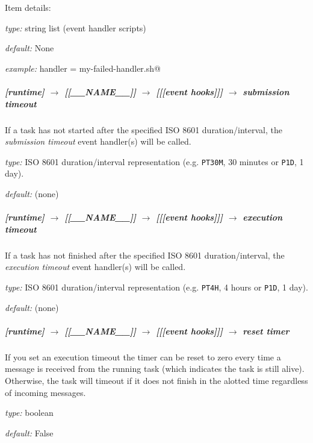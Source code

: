 Item details:
\begin{myitemize}
    \item {\em type:} string list (event handler scripts)
    \item {\em default:} None
    \item {\em example:} \lstinline@failed handler = my-failed-handler.sh@
\end{myitemize}

\subparagraph[submission timeout]{[runtime] $\rightarrow$ [[\_\_NAME\_\_]] $\rightarrow$ [[[event hooks]]] $\rightarrow$ submission timeout}

If a task has not started after the specified ISO 8601 duration/interval, the
{\em submission timeout} event handler(s) will be called.
\begin{myitemize}
    \item {\em type:} ISO 8601 duration/interval representation (e.g.
 \lstinline=PT30M=, 30 minutes or \lstinline=P1D=, 1 day).
    \item {\em default:} (none)
\end{myitemize}

\subparagraph[execution timeout]{[runtime] $\rightarrow$ [[\_\_NAME\_\_]] $\rightarrow$ [[[event hooks]]] $\rightarrow$ execution timeout}

If a task has not finished after the specified ISO 8601 duration/interval, the
{\em execution timeout} event handler(s) will be called.
\begin{myitemize}
    \item {\em type:} ISO 8601 duration/interval representation (e.g.
 \lstinline=PT4H=, 4 hours or \lstinline=P1D=, 1 day).
    \item {\em default:} (none)
\end{myitemize}

\subparagraph[reset timer]{[runtime] $\rightarrow$ [[\_\_NAME\_\_]] $\rightarrow$ [[[event hooks]]] $\rightarrow$ reset timer}

If you set an execution timeout the timer can be reset to zero every
time a message is received from the running task (which indicates the
task is still alive).  Otherwise, the task will timeout if it does not
finish in the alotted time regardless of incoming messages.

\begin{myitemize}
\item {\em type:} boolean
\item {\em default:} False
\end{myitemize}

